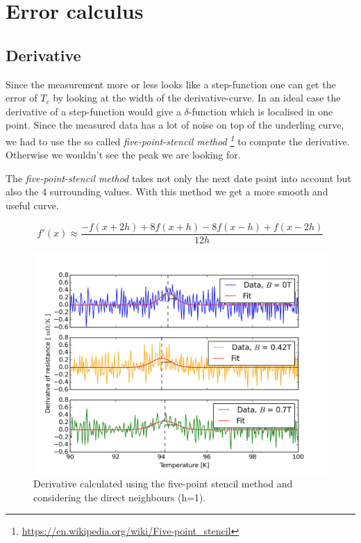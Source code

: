 \documentclass[a4paper,parskip,11pt, DIV12]{scrreprt}
\begin{document}
\chapter{Error calculus}

\section{Derivative}

Since the measurement more or less looks like a step-function one can get the error of $T_{c}$ by looking at the width of the derivative-curve. In an ideal case the derivative of a step-function would give a $\delta$-function which is localised in one point. Since the measured data has a lot of noise on top of the underling curve, we had to use the so called \emph{five-point-stencil method \footnote{\url{https://en.wikipedia.org/wiki/Five-point_stencil}}} to compute the derivative. Otherwise we wouldn't see the peak we are looking for. 

The \emph{five-point-stencil method} takes not only the next date point into account but also the 4 surrounding values. With this method we get a more smooth and useful curve. 

$$f'(x) \approx \frac{-f(x+2 h)+8 f(x+h)-8 f(x-h)+f(x-2h)}{12 h}$$

\begin{figure}[H]
\centering
\includegraphics[scale=0.11]{Criticaltemperature3}
\caption[]{Derivative calculated using the five-point stencil method and considering the direct neighbours (h=1).  }
\end{figure}
\end{document}
